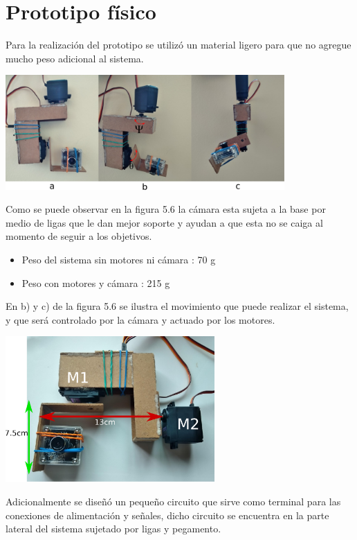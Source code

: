 \section{Prototipo físico}
Para la realización del prototipo se utilizó un material ligero para que no agregue mucho peso adicional al sistema.
\begin{center}
	\includegraphics[width=0.8\textwidth]{Contenido/Cuerpo/Capitulo5/Fig17.eps}
	\label{Fig1}
\end{center}
Como se puede observar en la figura 5.6 la cámara esta sujeta a la base por medio de ligas que le dan mejor soporte y ayudan a que
esta no se caiga al momento de seguir a los objetivos.
\begin{itemize}
	\item Peso del sistema sin motores ni cámara : 70 g
	\item Peso con motores y cámara : 215 g
\end{itemize}
En b) y c) de la figura 5.6 se ilustra el movimiento que puede realizar el sistema, y que será controlado
por la cámara y actuado por los motores.
\begin{center}
	\includegraphics[width=0.6\textwidth]{Contenido/Cuerpo/Capitulo5/Fig20.eps}
	\label{Fig4}
\end{center}
Adicionalmente se diseñó un pequeño circuito que sirve como terminal para las conexiones de alimentación y señales,
dicho circuito se encuentra en la parte lateral del sistema sujetado por ligas y pegamento.\\

